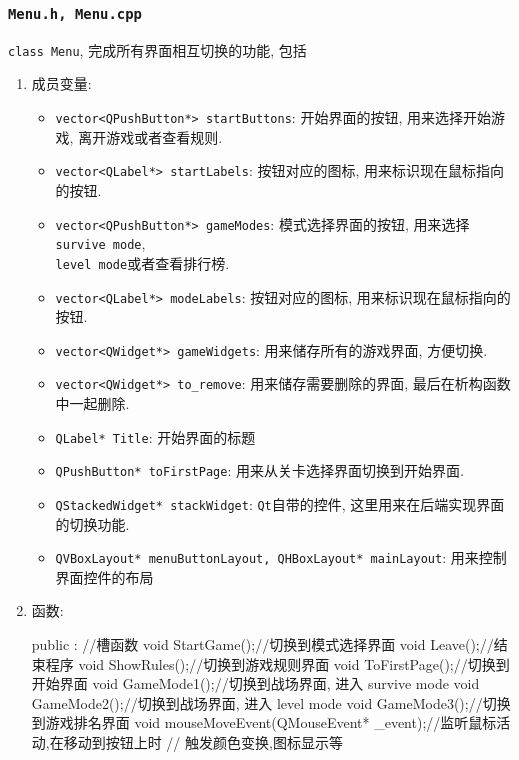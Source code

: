 \documentclass[UTF8,12pt]{ctexart}
\begin{document}
	        \subsubsection{\tt Menu.h, Menu.cpp}
	            \texttt{class Menu}, 完成所有界面相互切换的功能, 包括
	            \begin{enumerate}[nosep,label=\arabic*.]
	                \item 成员变量:
	                    \begin{itemize}[nosep]
	                        \item \texttt{vector<QPushButton*> startButtons}: 开始界面的按钮, 用来选择开始游戏, 离开游戏或者查看规则.
	                        \item \texttt{vector<QLabel*> startLabels}: 按钮对应的图标, 用来标识现在鼠标指向的按钮.
	                        \item \texttt{vector<QPushButton*> gameModes}: 模式选择界面的按钮, 用来选择\texttt{survive mode},\\
	                            \texttt{level mode}或者查看排行榜.
	                        \item \texttt{vector<QLabel*> modeLabels}: 按钮对应的图标, 用来标识现在鼠标指向的按钮.
	                        \item \texttt{vector<QWidget*> gameWidgets}: 用来储存所有的游戏界面, 方便切换.
	                        \item \texttt{vector<QWidget*> to_remove}: 用来储存需要删除的界面, 最后在析构函数中一起删除.
	                        \item \texttt{QLabel* Title}: 开始界面的标题
	                        \item \texttt{QPushButton* toFirstPage}: 用来从关卡选择界面切换到开始界面.
	                        \item \texttt{QStackedWidget* stackWidget}: \texttt{Qt}自带的控件, 这里用来在后端实现界面的切换功能.
	                        \item \texttt{QVBoxLayout* menuButtonLayout, QHBoxLayout* mainLayout}: 用来控制界面控件的布局
	                    \end{itemize}
	                \item 函数:
	                    \begin{cppcode}
                        public :          
                            //槽函数
                            void StartGame();//切换到模式选择界面
                            void Leave();//结束程序
                            void ShowRules();//切换到游戏规则界面
                            void ToFirstPage();//切换到开始界面
                            void GameMode1();//切换到战场界面, 进入 survive mode
                            void GameMode2();//切换到战场界面, 进入 level mode
                            void GameMode3();//切换到游戏排名界面
                            void mouseMoveEvent(QMouseEvent* _event);//监听鼠标活动,在移动到按钮上时
                                                    // 触发颜色变换,图标显示等   
                    \end{cppcode}
	            \end{enumerate}
\end{document}
